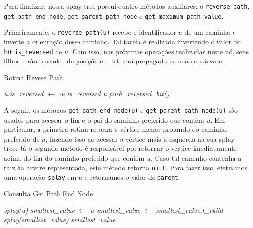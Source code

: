 Para finalizar, nossa splay tree possui quatro métodos auxiliares: o \texttt{reverse\_path}, \texttt{get\_path\_end\_node}, \texttt{get\_parent\_path\_node} e \texttt{get\_maximum\_path\_value}.

Primeiramente, o \texttt{reverse\_path(u)} recebe o identificador $u$ de um caminho e inverte a orientação desse caminho. Tal tarefa é realizada invertendo o valor do bit \texttt{is\_reversed} de $u$. Com isso, nas próximas operações realizadas neste nó, seus filhos serão trocados de posição e o bit será propagado na sua sub-árvore.

\begin{algorithm}[h!]
    \caption{Rotina Revese Path}\label{splay:reverse-path}
    \begin{algorithmic}
        \State \emph{u.is\_reversed $\gets \neg$u.is\_reversed}
        \State \emph{u.push\_reversed\_bit()} 
        \EndFunction
    \end{algorithmic}
\end{algorithm}

A seguir, os métodos \texttt{get\_path\_end\_node(u)} e \texttt{get\_parent\_path\_node(u)} são usados para acessar o fim e o pai do caminho preferido que contém $u$. Em particular, a primeira rotina retorna o vértice menos profundo do caminho preferido de $u$, fazendo isso ao acessar o vértice mais à esquerda na sua splay tree. Já o segundo método é responsável por retornar o vértice imediatamente acima do fim do caminho preferido que contém $u$. Caso tal caminho contenha a raiz da árvore representada, este método retorna \texttt{null}. Para fazer isso, efetuamos uma operação \texttt{splay} em $u$ e retornamos o valor de \texttt{parent}.

\begin{algorithm}[h!]
    \caption{Consulta Get Path End Node}\label{splay:get-path-end}
    \begin{algorithmic}
        \State \emph{splay(u)}
        \State \emph{smallest\_value $\gets$ u}
        \State \emph{smallest\_value $\gets$ smallest\_value.l\_child}
        \EndWhile
        \State \emph{splay(smallest\_value)}
        \State \Return \emph{smallest\_value}
        \EndFunction
    \end{algorithmic}
\end{algorithm}

